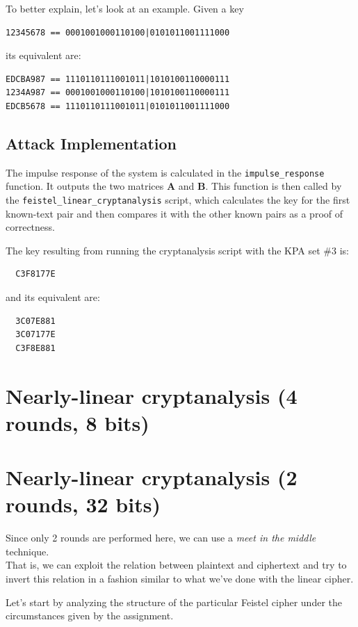 \documentclass[a4paper,12pt,titlepage]{article}
\begin{document}
To better explain, let's look at an example. Given a key
\begin{verbatim}
12345678 == 0001001000110100|0101011001111000
\end{verbatim}
its equivalent are:
\begin{verbatim}
EDCBA987 == 1110110111001011|1010100110000111
1234A987 == 0001001000110100|1010100110000111
EDCB5678 == 1110110111001011|0101011001111000
\end{verbatim}

\subsection*{Attack Implementation}
The impulse response of the system is calculated in the \texttt{impulse\_response}
function. It outputs the two matrices $\mathbf{A}$ and
$\mathbf{B}$. This function is then called by the
\texttt{feistel\_linear\_cryptanalysis} script, which calculates the key for the first
known-text pair and then compares it with the other known pairs as a proof of
correctness.

The key resulting from running the cryptanalysis script with the KPA set \#3 is:
\begin{verbatim}
  C3F8177E
\end{verbatim}

and its equivalent are:
\begin{verbatim}
  3C07E881
  3C07177E
  C3F8E881
\end{verbatim}

\section{Nearly-linear cryptanalysis (4 rounds, 8 bits)}
\section{Nearly-linear cryptanalysis (2 rounds, 32 bits)}
Since only 2 rounds are performed here, we can use a \emph{meet in the middle}
technique. \\
That is, we can exploit the relation between plaintext and ciphertext and try
to invert this relation in a fashion similar to what we've done with the linear
cipher.

Let's start by analyzing the structure of the particular Feistel cipher under
the circumstances given by the assignment. \\
\end{document}
